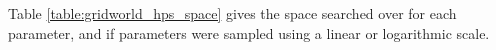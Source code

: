     
    Table \ref{table:gridworld_hps_space} gives the space searched over for each parameter, and if parameters were sampled using a linear or logarithmic scale.

